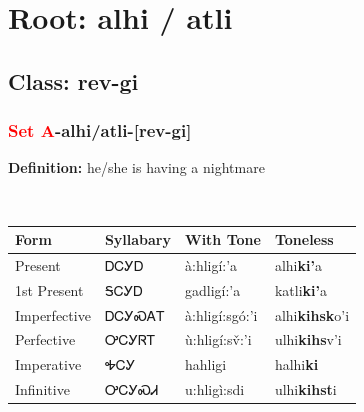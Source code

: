 \needspace{4in}
\section*{Root: alhi / atli}
\nopagebreak
{}
\needspace{3in}
\subsection*{Class: rev-gi}
\nopagebreak
\needspace{2in}
\subsubsection*{\textcolor{Red}{Set A}{-}\textbf{alhi/atli}{-}[rev-gi]}
\nopagebreak
\textbf{Definition: } he/she is having a nightmare
\\[0.5em]
\begin{tabularx}{\textwidth}{l X X X}%
\toprule%
\textbf{Form}&\textbf{Syllabary}&\textbf{With Tone}&\textbf{Toneless}\\%
\midrule%
Present&ᎠᏟᎩᎠ&à:hligí:’a&alhi\textbf{ki'}a\\%
1st Present&ᎦᏟᎩᎠ&gadligí:’a&katli\textbf{ki'}a\\%
Imperfective&ᎠᏟᎩᏍᎪᎢ&à:hligí:sgó:’i&alhi\textbf{kihsk}o'i\\%
Perfective&ᎤᏟᎩᏒᎢ&ù:hligí:sv̌:’i&ulhi\textbf{kihs}v'i\\%
Imperative&ᎭᏟᎩ&hahligi&halhi\textbf{ki}\\%
Infinitive&ᎤᏟᎩᏍᏗ&u:hligì:sdi&ulhi\textbf{kihst}i\\%
\bottomrule%
\end{tabularx}
\\[1em]